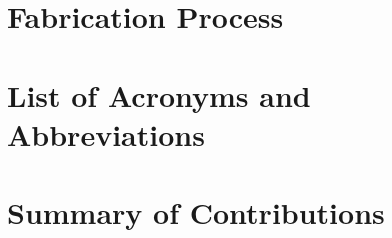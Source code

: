 \documentclass[12pt,onecolumn]{report}
\begin{document}
\begin{appendices}

\chapter{Fabrication Process} \label{Fabrication}
% 

\chapter{List of Acronyms and Abbreviations}
% 

\chapter{Summary of Contributions}
% 

\chapter{}

\end{appendices}
\end{document}
